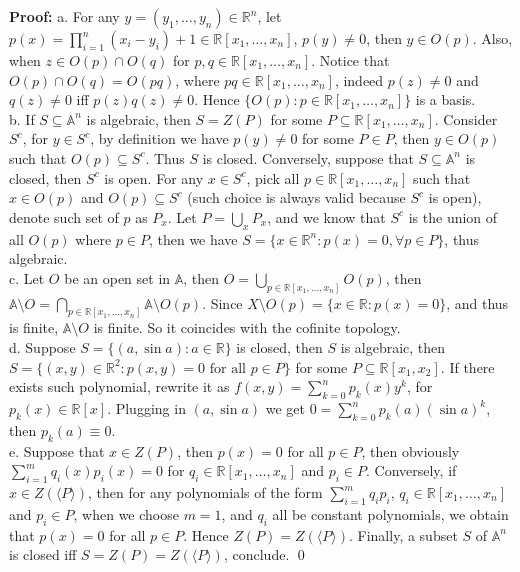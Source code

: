 \documentclass[12pt]{article}
\begin{document}
\textbf{Proof:} a. For any $y=(y_{1}, \dots, y_{n})\in\mathbb{R}^{n}$, let $p(x)=\prod_{i=1}^{n}(x_{i}-y_{i})+1\in\mathbb{R}[x_{1}, \dots, x_{n}]$, $p(y)\neq 0$, then $y\in O(p)$. Also, when $z\in O(p)\cap O(q)$ for $p,q\in\mathbb{R}[x_{1}, \dots, x_{n}]$. Notice that $O(p)\cap O(q)=O(pq)$, where $pq\in\mathbb{R}[x_{1}, \dots, x_{n}]$, indeed $p(z)\neq 0$ and $q(z)\neq 0$ iff $p(z)q(z)\neq 0$. Hence $\{O(p): p\in\mathbb{R}[x_{1}, \dots, x_{n}]\}$ is a basis. \\
\indent b. If $S\subseteq\mathbb{A}^{n}$ is algebraic, then $S=Z(P)$ for some $P\subseteq\mathbb{R}[x_{1}, \dots, x_{n}]$. Consider $S^{c}$, for $y\in S^{c}$, by definition we have $p(y)\neq 0$ for some $P\in P$, then $y\in O(p)$ such that $O(p)\subseteq S^{c}$. Thus $S$ is closed. Conversely, suppose that $S\subseteq\mathbb{A}^{n}$ is closed, then $S^{c}$ is open. For any $x\in S^{c}$, pick all $p\in\mathbb{R}[x_{1}, \dots, x_{n}]$ such that $x\in O(p)$ and $O(p)\subseteq S^{c}$ (such choice is always valid because $S^{c}$ is open), denote such set of $p$ as $P_{x}$. Let $P=\bigcup_{x}P_{x}$, and we know that $S^{c}$ is the union of all $O(p)$ where $p\in P$, then we have $S=\{x\in\mathbb{R}^{n}: p(x)=0,\forall p\in P\}$, thus algebraic. \\
\indent c. Let $O$ be an open set in $\mathbb{A}$, then $O=\bigcup_{p\in\mathbb{R}[x_{1}, \dots, x_{n}]} O(p)$, then $\mathbb{A}\setminus O=\bigcap_{p\in\mathbb{R}[x_{1}, \dots, x_{n}]}\mathbb{A}\setminus O(p)$. Since $X\setminus O(p)=\{x\in\mathbb{R}: p(x)=0\}$, and thus is finite, $\mathbb{A}\setminus O$ is finite. So it coincides with the cofinite topology. \\
\indent d. Suppose $S=\{(a,\sin a): a\in\mathbb{R}\}$ is closed, then $S$ is algebraic, then $S=\{(x,y)\in\mathbb{R}^{2}: p(x,y)=0\text{ for all } p\in P\}$ for some $P\subseteq\mathbb{R}[x_{1}, x_{2}]$. If there exists such polynomial, rewrite it as $f(x,y)=\sum\limits_{k=0}^{n}p_{k}(x)y^{k}$, for $p_{k}(x)\in\mathbb{R}[x]$. Plugging in $(a, \sin a)$ we get $0=\sum\limits_{k=0}^{n}p_{k}(a)(\sin a)^{k}$, then $p_{k}(a)\equiv 0$. \\
\indent e. Suppose that $x\in Z(P)$, then $p(x)=0$ for all $p\in P$, then obviously $\sum_{i=1}^{m}q_{i}(x)p_{i}(x)=0$ for $q_{i}\in\mathbb{R}[x_{1}, \dots, x_{n}]$ and $p_{i}\in P$. Conversely, if $x\in Z(\langle P\rangle)$, then for any polynomials of the form $\sum_{i=1}^{m}q_{i}p_{i}$, $q_{i}\in\mathbb{R}[x_{1}, \dots, x_{n}]$ and $p_{i}\in P$, when we choose $m=1$, and $q_{i}$ all be constant polynomials, we obtain that $p(x)=0$ for all $p\in P$. Hence $Z(P)=Z(\langle P\rangle)$. Finally, a subset $S$ of $\mathbb{A}^{n}$ is closed iff $S=Z(P)=Z(\langle P\rangle )$, conclude. \qed
\end{document}
